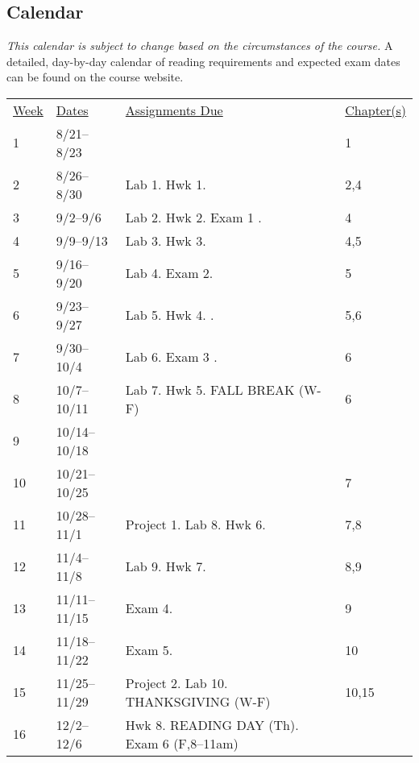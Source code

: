 \documentclass[10pt]{article}
\begin{document}
\subsection{Calendar}

\textit{This calendar is subject to change based on the circumstances of the course.} A detailed, day-by-day calendar of reading requirements and expected exam dates can be found on the course website.

\begin{center}
\begin{tabular}{llll}
\underline{Week} & \underline{Dates} & \underline{Assignments Due} & \underline{Chapter(s)}\\
1 & 8/21--8/23  &  &  1\\
2 & 8/26--8/30 & Lab 1. Hwk 1. &  2,4\\
3 & 9/2--9/6 & Lab 2. Hwk 2. Exam 1 .  &  4  \\
4 & 9/9--9/13  & Lab 3. Hwk 3. &   4,5 \\
5 & 9/16--9/20 & Lab 4. Exam 2. & 5\\
6 & 9/23--9/27 & Lab 5. Hwk 4. . & 5,6\\
7 & 9/30--10/4 & Lab 6. Exam 3 . &   6 \\
8 & 10/7--10/11 & Lab 7.  Hwk 5. FALL BREAK (W-F)  &  6 \\
9 & 10/14--10/18 &  &  \\
10 & 10/21--10/25  &  &  7 \\
11 & 10/28--11/1 & Project 1. Lab 8. Hwk 6. &  7,8 \\
12 & 11/4--11/8 &  Lab 9. Hwk 7. & 8,9 \\
13 & 11/11--11/15 & Exam 4.  &  9 \\
14 & 11/18--11/22 & Exam 5.  &  10 \\
15 & 11/25--11/29 & Project 2. Lab 10. THANKSGIVING (W-F)  &  10,15 \\
16 & 12/2--12/6 & Hwk 8. READING DAY (Th). Exam 6 (F,8--11am) &  \\
\end{tabular}
\end{center}
\end{document}
